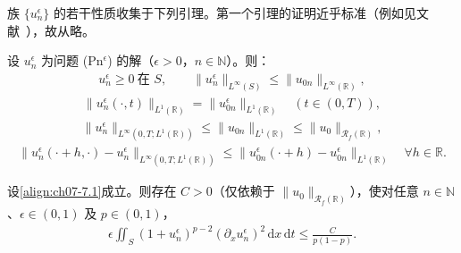 \documentclass[../../main.tex]{subfiles}%
\begin{document}
族 $\{u_n^\epsilon\}$ 的若干性质收集于下列引理。第一个引理的证明近乎标准（例如见文献~\cite{ref34}），故从略。

\begin{lemma}\label{lemma:ch07-7.4.1}
设 $u_n^\epsilon$ 为问题 (Pn$^\epsilon$) 的解（$\epsilon>0$，$n\in\mathbb{N}$）。则：
\begin{align}
u_n^\epsilon\geqslant0\ \text{在 }S,\qquad
\|u_n^\epsilon\|_{L^\infty(S)}\leqslant\|u_{0n}\|_{L^\infty(\mathbb{R})}, \label{align:ch07-7.49}
\end{align}
\begin{align}
\|u_n^\epsilon(\cdot,t)\|_{L^1(\mathbb{R})}=\|u_{0n}^\epsilon\|_{L^1(\mathbb{R})}\quad(t\in(0,T)), \label{align:ch07-7.50}
\end{align}
\begin{align}
\|u_n^\epsilon\|_{L^\infty(0,T;L^1(\mathbb{R}))}\leqslant\|u_{0n}\|_{L^1(\mathbb{R})}\leqslant\|u_0\|_{\mathscr{R}_f(\mathbb{R})}, \label{align:ch07-7.51}
\end{align}
\begin{align}
\|u_n^\epsilon(\cdot+h,\cdot)-u_n^\epsilon\|_{L^\infty(0,T;L^1(\mathbb{R}))}
\leqslant\|u_{0n}^\epsilon(\cdot+h)-u_{0n}^\epsilon\|_{L^1(\mathbb{R})}\quad\forall h\in\mathbb{R}. \label{align:ch07-7.52}
\end{align}
\end{lemma}

\begin{lemma}\label{lemma:ch07-7.4.2}
设\eqref{align:ch07-7.1}成立。则存在 $C>0$（仅依赖于 $\|u_0\|_{\mathscr{R}_f(\mathbb{R})}$），使对任意 $n\in\mathbb{N}$、$\epsilon\in(0,1)$ 及 $p\in(0,1)$，
\begin{align}
\epsilon\iint_S(1+u_n^\epsilon)^{p-2}(\partial_x u_n^\epsilon)^2\,\mathrm{d}x\,\mathrm{d}t
\leqslant\frac{C}{p(1-p)}. \label{align:ch07-7.53}
\end{align}
\end{lemma}
\end{document}
